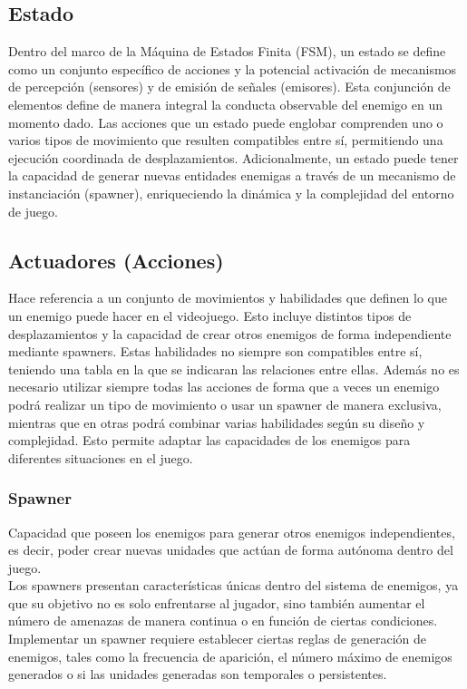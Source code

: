 \subsection{Estado}
\label{subsec:estado}

Dentro del marco de la Máquina de Estados Finita (FSM), un estado se define como un conjunto específico de acciones y la potencial activación de mecanismos de percepción (sensores) y de emisión de señales (emisores). Esta conjunción de elementos define de manera integral la conducta observable del enemigo en un momento dado. Las acciones que un estado puede englobar comprenden uno o varios tipos de movimiento que resulten compatibles entre sí, permitiendo una ejecución coordinada de desplazamientos. Adicionalmente, un estado puede tener la capacidad de generar nuevas entidades enemigas a través de un mecanismo de instanciación (spawner), enriqueciendo la dinámica y la complejidad del entorno de juego.

\subsection{Actuadores (Acciones)}
\label{subsec:acciones}
Hace referencia a un conjunto de movimientos y habilidades que definen lo que un enemigo puede hacer en el videojuego. Esto incluye distintos tipos de desplazamientos y la capacidad de crear otros enemigos de forma independiente mediante spawners. Estas habilidades no siempre son compatibles entre sí, teniendo una tabla en la que se indicaran las relaciones entre ellas. Además no es necesario utilizar siempre todas las acciones de forma que a veces un enemigo podrá realizar un tipo de movimiento o usar un spawner de manera exclusiva, mientras que en otras podrá combinar varias habilidades según su diseño y complejidad. Esto permite adaptar las capacidades de los enemigos para diferentes situaciones en el juego.
\subsubsection{Spawner}
Capacidad que poseen los enemigos para generar otros enemigos independientes, es decir, poder crear nuevas unidades que actúan de forma autónoma dentro del juego.\\
Los spawners presentan características únicas dentro del sistema de enemigos, ya que su objetivo no es solo enfrentarse al jugador, sino también aumentar el número de amenazas de manera continua o en función de ciertas condiciones.
Implementar un spawner requiere establecer ciertas reglas de generación de enemigos, tales como la frecuencia de aparición, el número máximo de enemigos generados o si las unidades generadas son temporales o persistentes.
